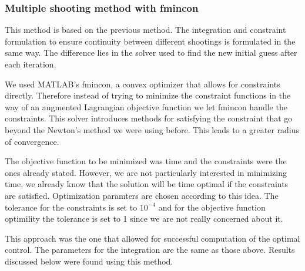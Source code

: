 \subsubsection{Multiple shooting method with fmincon}
This method is based on the previous method. The integration and constraint formulation to ensure continuity between different shootings is formulated in the same way. The difference lies in the solver used to find the new initial guess after each iteration.

We used MATLAB's fmincon, a convex optimizer that allows for constraints directly. Therefore instead of trying to minimize the constraint functions in the way of an augmented Lagrangian objective function we let fmincon handle the constraints. This solver introduces methods for satisfying the constraint that go beyond the Newton's method we were using before. This leads to a greater radius of convergence.

The objective function to be minimized was time and the constraints were the ones already stated. However, we are not particularly interested in minimizing time, we already know that the solution will be time optimal if the constraints are satisfied. Optimization paramters are chosen according to this idea. The tolerance for the constraints is set to $10^{-4}$ and for the objective function optimility the tolerance is set to 1 since we are not really concerned about it.

This approach was the one that allowed for successful computation of the optimal control. The parameters for the integration are the same as those above. Results discussed below were found using this method.
